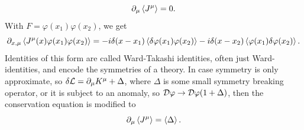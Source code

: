 %
\begin{equation}
    \partial_\mu \Braket{J^\mu} = 0.
\end{equation}
%
With $F = \varphi(x_1) \varphi(x_2)$, we get~\autocite{schwartzQuantumFieldTheory2013,peskinIntroductionQuantumField1995}
%
\begin{equation}
    \partial_{x, \mu} \braket{J^\mu (x)\varphi(x_1) \varphi(x_2)}
    = -i \delta(x - x_1) \braket{\delta \varphi(x_1) \varphi(x_2)}
    - i \delta(x - x_2) \braket{\varphi(x_1) \delta \varphi(x_2)}.
\end{equation}
%
Identities of this form are called Ward-Takashi identities, often just Ward-identities, and encode the symmetries of a theory.
In case symmetry is only approximate, so $\delta \mathcal L = \partial_\mu K^\mu + \Delta$, where $\Delta$ is some small symmetry breaking operator, or it is subject to an anomaly, so $\mathcal D \varphi \rightarrow \mathcal D \varphi (1 + \Delta)$, then the conservation equation is modified to
%
\begin{equation}
    \partial_\mu \Braket{J^\mu} = \Braket{\Delta}.
\end{equation}

